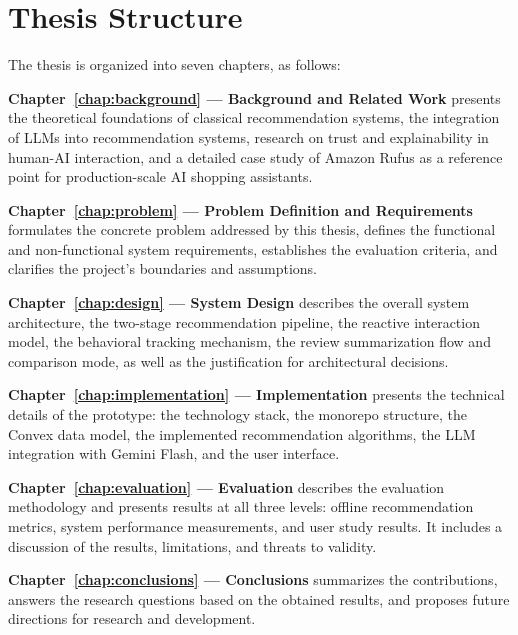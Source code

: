 \section{Thesis Structure}
\label{sec:intro-structure}

\par The thesis is organized into seven chapters, as follows:

\par \textbf{Chapter~\ref{chap:background} --- Background and Related Work} presents the theoretical foundations of classical recommendation systems, the integration of LLMs into recommendation systems, research on trust and explainability in human-AI interaction, and a detailed case study of Amazon Rufus as a reference point for production-scale AI shopping assistants.

\par \textbf{Chapter~\ref{chap:problem} --- Problem Definition and Requirements} formulates the concrete problem addressed by this thesis, defines the functional and non-functional system requirements, establishes the evaluation criteria, and clarifies the project's boundaries and assumptions.

\par \textbf{Chapter~\ref{chap:design} --- System Design} describes the overall system architecture, the two-stage recommendation pipeline, the reactive interaction model, the behavioral tracking mechanism, the review summarization flow and comparison mode, as well as the justification for architectural decisions.

\par \textbf{Chapter~\ref{chap:implementation} --- Implementation} presents the technical details of the prototype: the technology stack, the monorepo structure, the Convex data model, the implemented recommendation algorithms, the LLM integration with Gemini Flash, and the user interface.

\par \textbf{Chapter~\ref{chap:evaluation} --- Evaluation} describes the evaluation methodology and presents results at all three levels: offline recommendation metrics, system performance measurements, and user study results. It includes a discussion of the results, limitations, and threats to validity.

\par \textbf{Chapter~\ref{chap:conclusions} --- Conclusions} summarizes the contributions, answers the research questions based on the obtained results, and proposes future directions for research and development.
